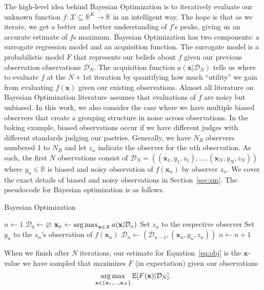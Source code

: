 The high-level idea behind Bayesian Optimization is to iteratively evaluate our unknown
function $f: \mathcal{X} \subseteq \mathbb{R}^{K} \to \mathbb{R}$ in an intelligent way.
The hope is that as we iterate, we get a better and better understanding of $f$'s
peaks, giving us an accurate estimate of $f$s maximum.
Bayesian Optimization has two components: a surrogate regression model and an acquisition function.
The surrogate model is a probabilistic model $F$ that represents our beliefs about $f$ given our previous observation observations $\mathcal{D}_N$.
The acquisition function $a( \mathbf{x} | \mathcal{D}_N)$ tells us where to evaluate $f$ at the $N + 1$st iteration by
quantifying how much ``utility'' we gain from evaluating $f(\mathbf{x})$ given our existing observations.
Almost all literature on Bayesian Optimization literature assumes that evaluations of $f$ are noisy but unbiased.
In this work, we also consider the case where we have multiple biased observers that create a grouping structure in noise across observations.
In the baking example, biased observations occur if we have different judges with different standards judging our pastries.
Generally, we have $N_B$ observers numbered 1 to $N_B$ and let $z_n$ indicate the observer for the $n$th observation.
As such, the first $N$ observations consist of $\mathcal{D}_N = ((\mathbf{x}_1, y_1, z_1), \ldots, (\mathbf{x}_N, y_N, z_N))$ where
$y_n \in \mathbb{R}$ is biased and noisy observation of $f(\mathbf{x}_n)$ by observer $z_n$.
We cover the exact details of biased and noisy observations in Section~\ref{sec:sm}.
The pseudocode for Bayesian optimization is as follows.
\begin{algorithm}
    \begin{algorithmic}[1]
        \caption{Bayesian Optimization}
        \label{alg:bo}
        \State $n \gets 1$
        \State $\mathcal{D}_0 \gets \varnothing$
        \State $\mathbf{x}_n \gets \operatorname*{arg\,max}_{\mathbf{x} \in \mathcal{X}} a(\mathbf{x} | \mathcal{D}_n)$  
        \State Set $z_n$ to the respective observer
        \State Set $y_n$ to the $z_n$'s observation of $f(\mathbf{x}_n)$
        \State $\mathcal{D}_n \gets (\mathcal{D}_{n - 1}, (\mathbf{x}_n, y_n, z_n))$
        \State $n \gets n + 1$
        \EndWhile
    \end{algorithmic}
\end{algorithm}

When we finish after $N$ iterations, our estimate for Equation~\ref{eq:obj} is
the $\mathbf{x}$-value we have sampled that maximizes $F$ (in expectation) given our observations
\begin{equation*}
    \operatorname*{arg\,max}_{\mathbf{x} \in \{ \mathbf{x}_1, \dots, \mathbf{x}_N \} } \mathbb{E}[F(\mathbf{x}) | \mathcal{D}_N].
\end{equation*}

